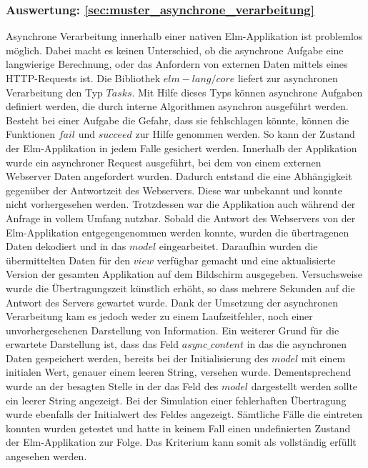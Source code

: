 \subsubsection{Auswertung: \ref{sec:muster_asynchrone_verarbeitung} }
Asynchrone Verarbeitung innerhalb einer nativen Elm-Applikation ist problemlos möglich. Dabei macht es keinen Unterschied, ob die asynchrone Aufgabe eine langwierige Berechnung, oder das Anfordern von externen Daten mittels eines \ac{HTTP}-Requests ist. Die Bibliothek $elm-lang/core$ liefert zur asynchronen Verarbeitung den Typ $Tasks$. Mit Hilfe dieses Typs  können asynchrone Aufgaben definiert werden, die durch interne Algorithmen asynchron ausgeführt werden. Besteht bei einer Aufgabe die Gefahr, dass sie fehlschlagen könnte, können die Funktionen $fail$ und $succeed$ zur Hilfe genommen werden. So kann der Zustand der Elm-Applikation in jedem Falle gesichert werden. Innerhalb der Applikation wurde ein asynchroner Request ausgeführt, bei dem von einem externen Webserver Daten angefordert wurden. Dadurch entstand die eine Abhängigkeit gegenüber der Antwortzeit des Webservers. Diese war unbekannt und konnte nicht vorhergesehen werden. Trotzdessen war die Applikation auch während der Anfrage in vollem Umfang nutzbar. Sobald die Antwort des Webservers von der Elm-Applikation entgegengenommen werden konnte, wurden die übertragenen Daten dekodiert und in das $model$ eingearbeitet. Daraufhin wurden die übermittelten Daten für den $view$ verfügbar gemacht und eine aktualisierte Version der gesamten Applikation auf dem Bildschirm ausgegeben.
Versuchsweise wurde die Übertragungszeit künstlich erhöht, so dass mehrere Sekunden auf die Antwort des Servers gewartet wurde. Dank der Umsetzung der asynchronen Verarbeitung kam es jedoch weder zu einem Laufzeitfehler, noch einer unvorhergesehenen Darstellung von Information. Ein weiterer Grund für die erwartete Darstellung ist, dass das Feld $async\_content$ in das die asynchronen Daten gespeichert werden, bereits bei der Initialisierung des $model$ mit einem initialen Wert, genauer einem leeren String, versehen wurde. Dementsprechend wurde an der besagten Stelle in der das Feld des $model$ dargestellt werden sollte ein leerer String angezeigt. Bei der Simulation einer fehlerhaften Übertragung wurde ebenfalls der Initialwert des Feldes angezeigt. Sämtliche Fälle die eintreten konnten wurden getestet und hatte in keinem Fall einen undefinierten Zustand der Elm-Applikation zur Folge.
Das Kriterium kann somit als vollständig erfüllt angesehen werden.

